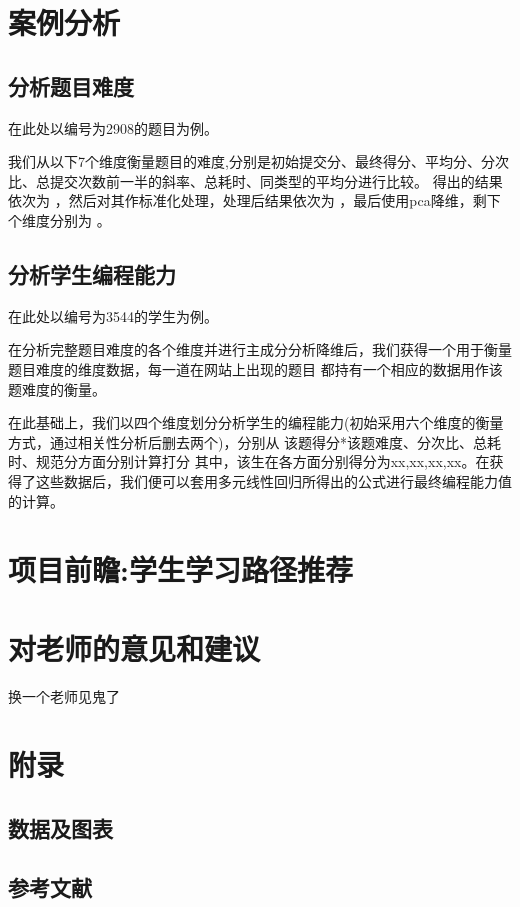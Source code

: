 \documentclass[UTF8]{ctexart}
\begin{document}
\section{案例分析}
\subsection{分析题目难度}
在此处以编号为2908的题目为例。

我们从以下7个维度衡量题目的难度,分别是初始提交分、最终得分、平均分、分次比、总提交次数前一半的斜率、总耗时、同类型的平均分进行比较。
得出的结果依次为               ，然后对其作标准化处理，处理后结果依次为        ，最后使用pca降维，剩下 个维度分别为   。
\subsection{分析学生编程能力}
在此处以编号为3544的学生为例。

在分析完整题目难度的各个维度并进行主成分分析降维后，我们获得一个用于衡量题目难度的维度数据，每一道在网站上出现的题目
都持有一个相应的数据用作该题难度的衡量。

在此基础上，我们以四个维度划分分析学生的编程能力(初始采用六个维度的衡量方式，通过相关性分析后删去两个)，分别从 该题得分*该题难度、分次比、总耗时、规范分方面分别计算打分
其中，该生在各方面分别得分为xx,xx,xx,xx。在获得了这些数据后，我们便可以套用多元线性回归所得出的公式进行最终编程能力值的计算。
\section{项目前瞻:学生学习路径推荐}
\section{对老师的意见和建议}
换一个老师见鬼了
\section{附录}
\subsection{数据及图表}
\subsection{参考文献}
\end{document}
